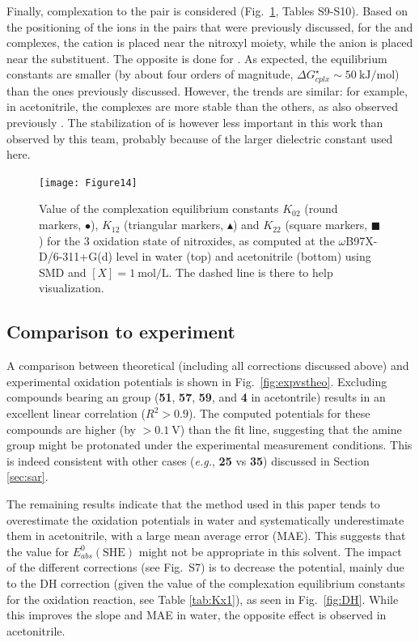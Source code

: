 \documentclass[review,preprint]{elsarticle}
\begin{document}
Finally, complexation to the  pair is considered (Fig.~\ref{fig:Kx2}, Tables S9-S10). Based on the positioning of the ions in the pairs that were previously discussed, for the  and  complexes, the cation is placed near the nitroxyl moiety, while the anion is placed near the substituent. The opposite is done for . As expected, the equilibrium constants are smaller (by about four orders of magnitude, $\Delta G^\star_{cplx} \sim \SI{50}{\kilo\joule\per\mole}$) than the ones previously discussed. However, the trends are similar: for example, in acetonitrile, the  complexes are more stable than the others, as also observed previously \cite{wylieImprovedPerformanceAllOrganic2019a}. The stabilization of  is however less important in this work than observed by this team, probably because of the larger dielectric constant used here.


\begin{figure}[!h]
\centering
\texttt{[image: Figure14]}
\caption{Value of the complexation equilibrium constants $K_{02}$ (round markers, $\bullet$), $K_{12}$ (triangular markers, $\blacktriangle$) and $K_{22}$ (square markers, $\blacksquare$) for the 3 oxidation state of nitroxides, as computed at the $\omega$B97X-D/6-311+G(d) level in water (top) and acetonitrile (bottom) using SMD and $[X]=\SI{1}{\mole\per\liter}$.  The dashed line is there to help visualization. }
\label{fig:Kx2}
\end{figure}

\clearpage
\subsection{Comparison to experiment} \label{sec:exp}

A comparison between theoretical (including all corrections discussed above) and experimental oxidation potentials is shown in Fig.~\ref{fig:expvstheo}. Excluding compounds bearing an  group (\textbf{51}, \textbf{57}, \textbf{59}, and \textbf{4} in acetontrile) results in an excellent linear correlation ($R^2 > 0.9$). The computed potentials for these compounds are higher (by $>\SI{0.1}{\volt}$) than the fit line, suggesting that the amine group might be protonated under the experimental measurement conditions. This is indeed consistent with other cases (\textit{e.g.}, \textbf{25} vs \textbf{35}) discussed in Section \ref{sec:sar}. 

The remaining results indicate that the method used in this paper tends to overestimate the oxidation potentials in water and systematically underestimate them in acetonitrile, with a large mean average error (MAE). This suggests that the value for $E^0_{abs}(\text{SHE})$ might not be appropriate in this solvent. The impact of the different corrections (see Fig.~S7) is to decrease the potential, mainly due to the DH correction (given the value of the complexation equilibrium constants for the oxidation reaction, see Table \ref{tab:Kx1}), as seen in Fig.~\ref{fig:DH}. While this improves the slope and MAE in water, the opposite effect is observed in acetonitrile.
\end{document}
